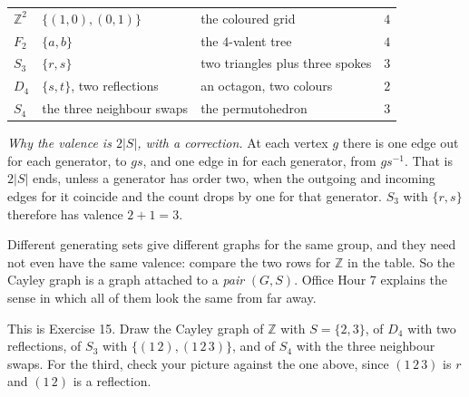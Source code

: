 \documentclass[10pt]{article}
\newcommand{\Z}{\mathbb{Z}}
\newcommand{\inv}{^{-1}}
\begin{document}
{\begin{minipage}[t]{744pt}
\begin{minipage}[t]{358pt}
\begin{tabular}{@{}llll@{}}
$\Z^2$ & $\{(1,0),(0,1)\}$ & the coloured grid & $4$\\
$F_2$ & $\{a,b\}$ & the $4$-valent tree & $4$\\
$S_3$ & $\{r,s\}$ & two triangles plus three spokes & $3$\\
$D_4$ & $\{s,t\}$, two reflections & an octagon, two colours & $2$\\
$S_4$ & the three neighbour swaps & the permutohedron & $3$\\
\bottomrule
\end{tabular}\par\vspace{4pt}
\raggedright
\begin{why}
\emph{Why the valence is $2|S|$, with a correction.} At each vertex $g$ there is one edge out for each generator, to $gs$, and one edge in for each generator, from $gs\inv$. That is $2|S|$ ends, unless a generator has order two, when the outgoing and incoming edges for it coincide and the count drops by one for that generator. $S_3$ with $\{r,s\}$ therefore has valence $2+1=3$.
\end{why}
\begin{pitfall}
Different generating sets give different graphs for the same group, and they need not even have the same valence: compare the two rows for $\Z$ in the table. So the Cayley graph is a graph attached to a \emph{pair} $(G,S)$. Office Hour 7 explains the sense in which all of them look the same from far away.
\end{pitfall}
\begin{tryit}
This is Exercise 15. Draw the Cayley graph of $\Z$ with $S=\{2,3\}$, of $D_4$ with two reflections, of $S_3$ with $\{(1\,2),(1\,2\,3)\}$, and of $S_4$ with the three neighbour swaps. For the third, check your picture against the one above, since $(1\,2\,3)$ is $r$ and $(1\,2)$ is a reflection.
\end{tryit}
\end{minipage}
\end{minipage}
}
\end{document}
